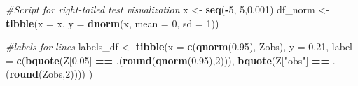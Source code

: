 \documentclass[
]{article}
\newenvironment{Shaded}{\begin{snugshade}}{\end{snugshade}}
\newcommand{\AttributeTok}[1]{\textcolor[rgb]{0.13,0.29,0.53}{#1}}
\newcommand{\CommentTok}[1]{\textcolor[rgb]{0.56,0.35,0.01}{\textit{#1}}}
\newcommand{\DecValTok}[1]{\textcolor[rgb]{0.00,0.00,0.81}{#1}}
\newcommand{\FloatTok}[1]{\textcolor[rgb]{0.00,0.00,0.81}{#1}}
\newcommand{\FunctionTok}[1]{\textcolor[rgb]{0.13,0.29,0.53}{\textbf{#1}}}
\newcommand{\NormalTok}[1]{#1}
\newcommand{\OtherTok}[1]{\textcolor[rgb]{0.56,0.35,0.01}{#1}}
\newcommand{\SpecialCharTok}[1]{\textcolor[rgb]{0.81,0.36,0.00}{\textbf{#1}}}
\newcommand{\StringTok}[1]{\textcolor[rgb]{0.31,0.60,0.02}{#1}}
\begin{document}
\begin{Shaded}
\begin{Highlighting}[]
\CommentTok{\#Script for right{-}tailed test visualization}
\NormalTok{x }\OtherTok{\textless{}{-}} \FunctionTok{seq}\NormalTok{(}\SpecialCharTok{{-}}\DecValTok{5}\NormalTok{, }\DecValTok{5}\NormalTok{,}\FloatTok{0.001}\NormalTok{)}
\NormalTok{df\_norm }\OtherTok{\textless{}{-}} \FunctionTok{tibble}\NormalTok{(}\AttributeTok{x =}\NormalTok{ x, }\AttributeTok{y =} \FunctionTok{dnorm}\NormalTok{(x, }\AttributeTok{mean =} \DecValTok{0}\NormalTok{, }\AttributeTok{sd =} \DecValTok{1}\NormalTok{))}

\CommentTok{\#labels for lines}
\NormalTok{labels\_df }\OtherTok{\textless{}{-}} \FunctionTok{tibble}\NormalTok{(}\AttributeTok{x =} \FunctionTok{c}\NormalTok{(}\FunctionTok{qnorm}\NormalTok{(}\FloatTok{0.95}\NormalTok{), Zobs), }\AttributeTok{y =} \FloatTok{0.21}\NormalTok{,}
                 \AttributeTok{label =} \FunctionTok{c}\NormalTok{(}\FunctionTok{bquote}\NormalTok{(Z[}\FloatTok{0.05}\NormalTok{] }\SpecialCharTok{==}\NormalTok{ .(}\FunctionTok{round}\NormalTok{(}\FunctionTok{qnorm}\NormalTok{(}\FloatTok{0.95}\NormalTok{),}\DecValTok{2}\NormalTok{))), }\FunctionTok{bquote}\NormalTok{(Z[}\StringTok{"obs"}\NormalTok{] }\SpecialCharTok{==}\NormalTok{ .(}\FunctionTok{round}\NormalTok{(Zobs,}\DecValTok{2}\NormalTok{)))) )}


\end{Highlighting}
\end{Shaded}
\end{document}
